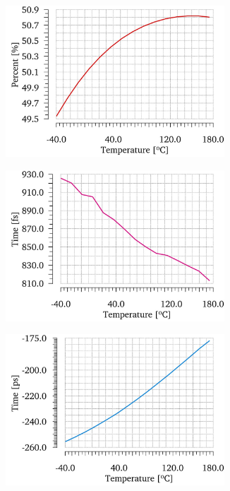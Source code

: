 \begin{figure}[htp]
    \centering
    \begin{subfigure}[b]{0.32\textwidth}
        \includegraphics[width=0.9\textwidth]{Chapter5/Figs/lvds/duty_cycle_vcm1V.jpg}
    \end{subfigure}
    \begin{subfigure}[b]{0.32\textwidth}
        \includegraphics[width=0.9\textwidth]{Chapter5/Figs/lvds/period_jitter_vcm1V.jpg}
    \end{subfigure}
    \begin{subfigure}[b]{0.32\textwidth}
        \includegraphics[width=0.9\textwidth]{Chapter5/Figs/lvds/period_error_vcm1V.jpg}

\end{subfigure}
\end{figure}
